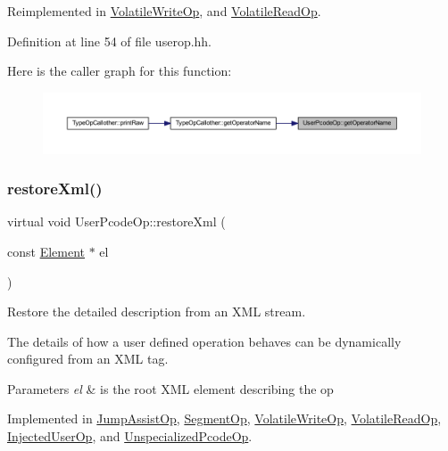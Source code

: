 Reimplemented in \mbox{\hyperlink{class_volatile_write_op_aba63c56acfa184a248cfa78e1d346af5}{Volatile\+Write\+Op}}, and \mbox{\hyperlink{class_volatile_read_op_afb60313306e36c095f37000b325142a0}{Volatile\+Read\+Op}}.



Definition at line 54 of file userop.\+hh.

Here is the caller graph for this function\+:
\nopagebreak
\begin{figure}[H]
\begin{center}
\leavevmode
\includegraphics[width=350pt]{class_user_pcode_op_a7529472e93f9077d5bfdb9cc1142bfbb_icgraph}
\end{center}
\end{figure}
\mbox{\label{class_user_pcode_op_a2a7b7c637369bc4fba4604cd83a937af}} 
\subsubsection{\texorpdfstring{restoreXml()}{restoreXml()}}
{\footnotesize\ttfamily virtual void User\+Pcode\+Op\+::restore\+Xml (\begin{DoxyParamCaption}\item[{const \mbox{\hyperlink{class_element}{Element}} $\ast$}]{el }\end{DoxyParamCaption})\hspace{0.3cm}{\ttfamily [pure virtual]}}



Restore the detailed description from an X\+ML stream. 

The details of how a user defined operation behaves can be dynamically configured from an X\+ML tag. 
\begin{DoxyParams}{Parameters}
{\em el} & is the root X\+ML element describing the op \\
\hline
\end{DoxyParams}


Implemented in \mbox{\hyperlink{class_jump_assist_op_a2e246c75988410d0fbdae74e44eb09cc}{Jump\+Assist\+Op}}, \mbox{\hyperlink{class_segment_op_a6f311b351e8d30119469650d5e33f84b}{Segment\+Op}}, \mbox{\hyperlink{class_volatile_write_op_a7d0ae9b968d11ff809a46dec31e94d43}{Volatile\+Write\+Op}}, \mbox{\hyperlink{class_volatile_read_op_abdb0f4262d311abca0c8a3fe07ed758e}{Volatile\+Read\+Op}}, \mbox{\hyperlink{class_injected_user_op_ae0eb3ef1744912d47b0fd5f01c079515}{Injected\+User\+Op}}, and \mbox{\hyperlink{class_unspecialized_pcode_op_a3e3e33005e96d5daef2aa26234d02d51}{Unspecialized\+Pcode\+Op}}.



